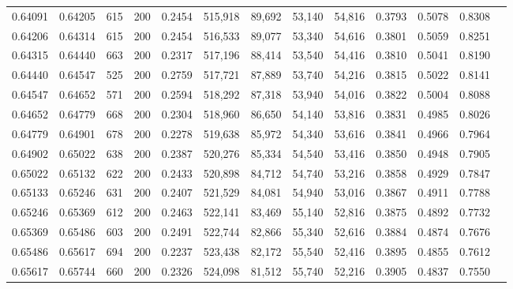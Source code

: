 \begin{tabular}{rrrrrrrrrrrrr}
0.64091 & 0.64205 &    615 & 200 &                                     0.2454 & 515,918 &  89,692 &  53,140 &  54,816 & 0.3793 & 0.5078 & 0.8308 \\
0.64206 & 0.64314 &    615 & 200 &                                     0.2454 & 516,533 &  89,077 &  53,340 &  54,616 & 0.3801 & 0.5059 & 0.8251 \\
0.64315 & 0.64440 &    663 & 200 &                                     0.2317 & 517,196 &  88,414 &  53,540 &  54,416 & 0.3810 & 0.5041 & 0.8190 \\
0.64440 & 0.64547 &    525 & 200 &                                     0.2759 & 517,721 &  87,889 &  53,740 &  54,216 & 0.3815 & 0.5022 & 0.8141 \\
0.64547 & 0.64652 &    571 & 200 &                                     0.2594 & 518,292 &  87,318 &  53,940 &  54,016 & 0.3822 & 0.5004 & 0.8088 \\
0.64652 & 0.64779 &    668 & 200 &                                     0.2304 & 518,960 &  86,650 &  54,140 &  53,816 & 0.3831 & 0.4985 & 0.8026 \\
0.64779 & 0.64901 &    678 & 200 &                                     0.2278 & 519,638 &  85,972 &  54,340 &  53,616 & 0.3841 & 0.4966 & 0.7964 \\
0.64902 & 0.65022 &    638 & 200 &                                     0.2387 & 520,276 &  85,334 &  54,540 &  53,416 & 0.3850 & 0.4948 & 0.7905 \\
0.65022 & 0.65132 &    622 & 200 &                                     0.2433 & 520,898 &  84,712 &  54,740 &  53,216 & 0.3858 & 0.4929 & 0.7847 \\
0.65133 & 0.65246 &    631 & 200 &                                     0.2407 & 521,529 &  84,081 &  54,940 &  53,016 & 0.3867 & 0.4911 & 0.7788 \\
0.65246 & 0.65369 &    612 & 200 &                                     0.2463 & 522,141 &  83,469 &  55,140 &  52,816 & 0.3875 & 0.4892 & 0.7732 \\
0.65369 & 0.65486 &    603 & 200 &                                     0.2491 & 522,744 &  82,866 &  55,340 &  52,616 & 0.3884 & 0.4874 & 0.7676 \\
0.65486 & 0.65617 &    694 & 200 &                                     0.2237 & 523,438 &  82,172 &  55,540 &  52,416 & 0.3895 & 0.4855 & 0.7612 \\
0.65617 & 0.65744 &    660 & 200 &                                     0.2326 & 524,098 &  81,512 &  55,740 &  52,216 & 0.3905 & 0.4837 & 0.7550 \\

\end{tabular}
